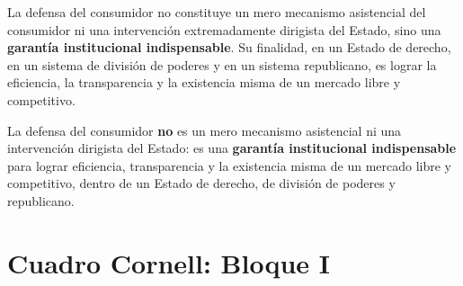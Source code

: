 \documentclass[12pt,oneside]{book}
\begin{document}
La defensa del consumidor no constituye un mero mecanismo asistencial del consumidor ni una intervenci\'on extremadamente dirigista del Estado, sino una \textbf{garant\'ia institucional indispensable}. Su finalidad, en un Estado de derecho, en un sistema de divisi\'on de poderes y en un sistema republicano, es lograr la eficiencia, la transparencia y la existencia misma de un mercado libre y competitivo.

\begin{important}
La defensa del consumidor \textbf{no} es un mero mecanismo asistencial ni una intervenci\'on dirigista del Estado: es una \textbf{garant\'ia institucional indispensable} para lograr eficiencia, transparencia y la existencia misma de un mercado libre y competitivo, dentro de un Estado de derecho, de divisi\'on de poderes y republicano.
\end{important}

\section{Cuadro Cornell: Bloque I}
\end{document}
